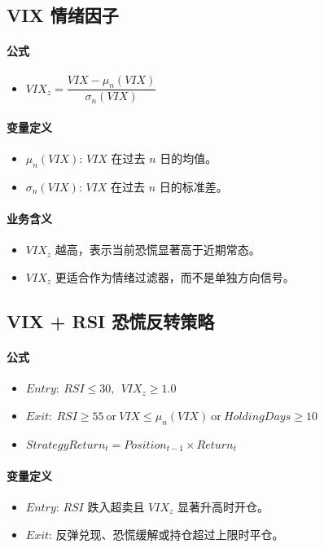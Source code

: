 \documentclass[11pt,a4paper]{ctexart}
\begin{document}
\subsection{VIX 情绪因子}
\paragraph{公式}
\begin{itemize}
\item $VIX_z=\dfrac{VIX-\mu_n(VIX)}{\sigma_n(VIX)}$
\end{itemize}
\paragraph{变量定义}
\begin{itemize}
\item $\mu_n(VIX)$: $VIX$ 在过去 $n$ 日的均值。
\item $\sigma_n(VIX)$: $VIX$ 在过去 $n$ 日的标准差。
\end{itemize}
\paragraph{业务含义}
\begin{itemize}
\item $VIX_z$ 越高，表示当前恐慌显著高于近期常态。
\item $VIX_z$ 更适合作为情绪过滤器，而不是单独方向信号。
\end{itemize}
\subsection{VIX + RSI 恐慌反转策略}
\paragraph{公式}
\begin{itemize}
\item $Entry:\ RSI \leq 30,\ \ VIX_z \geq 1.0$
\item $Exit:\ RSI \geq 55\ \mathrm{or}\ VIX \leq \mu_n(VIX)\ \mathrm{or}\ HoldingDays \geq 10$
\item $StrategyReturn_t=Position_{t-1}\times Return_t$
\end{itemize}
\paragraph{变量定义}
\begin{itemize}
\item $Entry$: $RSI$ 跌入超卖且 $VIX_z$ 显著升高时开仓。
\item $Exit$: 反弹兑现、恐慌缓解或持仓超过上限时平仓。
\end{itemize}
\end{document}
